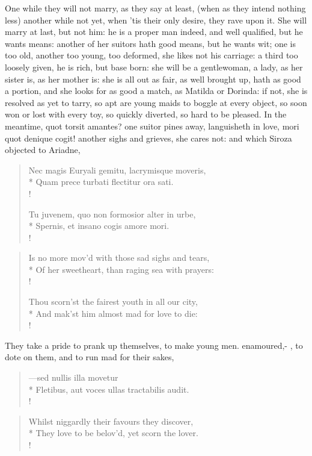 One while they will not marry, as they say at least, (when as they
intend nothing less) another while not yet, when 'tis their only
desire, they rave upon it. She will marry at last, but not him: he is a
proper man indeed, and well qualified, but he wants means: another of
her suitors hath good means, but he wants wit; one is too old, another
too young, too deformed, she likes not his carriage: a third too
loosely given, he is rich, but base born: she will be a gentlewoman, a
lady, as her sister is, as her mother is: she is all out as fair, as
well brought up, hath as good a portion, and she looks for as good a
match, as Matilda or Dorinda: if not, she is resolved as yet to tarry,
so apt are young maids to boggle at every object, so soon won or lost
with every toy, so quickly diverted, so hard to be pleased. In the
meantime, quot torsit amantes? one suitor pines away, languisheth in
love, mori quot denique cogit! another sighs and grieves, she cares
not: and which Siroza objected to Ariadne,
%
\begin{latin}%
\begin{verse}%
Nec magis Euryali gemitu, lacrymisque moveris,\\*
Quam prece turbati flectitur ora sati.\\!

Tu juvenem, quo non formosior alter in urbe,\\*
Spernis, et insano cogis amore mori.\\!
\end{verse}%
\end{latin}%
\translationrule%
\begin{verse}%
Is no more mov'd with those sad sighs and tears,\\*
Of her sweetheart, than raging sea with prayers:\\!

Thou scorn'st the fairest youth in all our city,\\*
And mak'st him almost mad for love to die:\\!
\end{verse}%

They take a pride to prank up themselves, to make young men. enamoured,-
,
 to dote on them, and to run mad for their sakes,
%
\begin{latin}%
\begin{verse}%
---sed nullis illa movetur\\*
Fletibus, aut voces ullas tractabilis audit.\\!
\end{verse}%
\end{latin}%
\translationrule%
\begin{verse}%
Whilst niggardly their favours they discover,\\*
They love to be belov'd, yet scorn the lover.\\!
\end{verse}%
%

